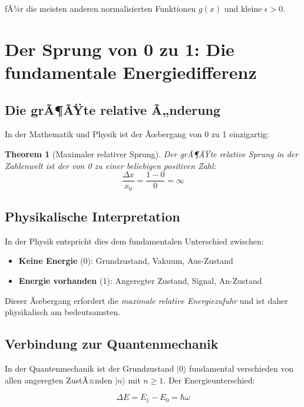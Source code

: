 ﻿\documentclass[12pt,a4paper]{article}
\newtheorem{theorem}{Theorem}[section]
\theoremstyle{definition}
\theoremstyle{remark}
\begin{document}
fÃ¼r die meisten anderen normalisierten Funktionen $g(x)$ und kleine $\epsilon > 0$.

\section{Der Sprung von 0 zu 1: Die fundamentale Energiedifferenz}

\subsection{Die grÃ¶ÃŸte relative Ã„nderung}

In der Mathematik und Physik ist der Ãœbergang von 0 zu 1 einzigartig:

\begin{theorem}[Maximaler relativer Sprung]
Der grÃ¶ÃŸte relative Sprung in der Zahlenwelt ist der von 0 zu einer beliebigen positiven Zahl:
\begin{equation}
\frac{\Delta x}{x_0} = \frac{1-0}{0} = \infty
\end{equation}
\end{theorem}

\subsection{Physikalische Interpretation}

In der Physik entspricht dies dem fundamentalen Unterschied zwischen:
\begin{itemize}
\item \textbf{Keine Energie} (0): Grundzustand, Vakuum, Aus-Zustand
\item \textbf{Energie vorhanden} (1): Angeregter Zustand, Signal, An-Zustand
\end{itemize}

Dieser Ãœbergang erfordert die \textit{maximale relative Energiezufuhr} und ist daher physikalisch am bedeutsamsten.

\subsection{Verbindung zur Quantenmechanik}

In der Quantenmechanik ist der Grundzustand $|0\rangle$ fundamental verschieden von allen angeregten ZustÃ¤nden $|n\rangle$ mit $n \geq 1$. Der Energieunterschied:

\begin{equation}
\Delta E = E_1 - E_0 = \hbar \omega
\end{equation}
\end{document}
